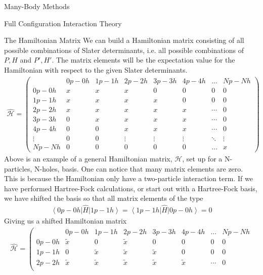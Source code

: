 \documentclass[twoside,english]{uiofysmaster}
\begin{document}
\begin{chapter}{Many-Body Methods}
\begin{section}{Full Configuration Interaction Theory}
		\begin{subsection}{The Hamiltonian Matrix}
			We can build a Hamiltonian matrix consisting of all possible combinations of Slater determinants, i.e. all possible combinations of $P,H$ and $P',H'$. The matrix elements will be the expectation value for the Hamiltonian with respect to the given Slater determinants. 
			\begin{align}
				\hat{ \mathcal{H} } = \left(  \begin{matrix}
							& 0p - 0h & 1p - 1h & 2p - 2h & 3p - 3h & 4p-4h & ... & Np - Nh \\ 
					0p - 0h & x 	  & x 		& x 	  & 0 		& 0 	& 0	   & 0 		\\		
					1p - 1h & x 	  & x 		& x 	  & x  		& 0 	& 0    & 0 		\\
					2p - 2h & x 	  & x 		& x 	  & x  		& x		&\cdots& 0		\\
					3p - 3h & 0 	  & x 		& x 	  & x  		& x 	&\cdots& 0 		\\
					4p - 4h & 0		  & 0 		& x 	  & x 		& x 	&\cdots& 0		\\
					\vdots 	& 0  	  & 0 	    & \vdots  & \vdots  & \vdots&\ddots& \vdots \\
					Np - Nh & 0 	  & 0		& 0 	  & 0 		& 0		&\hdots& x
				\end{matrix} \right)
			\end{align}
			Above is an example of a general Hamiltonian matrix, $\mathcal{H}$, set up for a N-particles, N-holes, basis. One can notice that many matrix elements are zero. This is because the Hamiltonian only have a two-particle interaction term. If we have performed Hartree-Fock calculations, or start out with a Hartree-Fock basis, we have shifted the basis so that all matrix elements of the type
			\begin{align}
				\left< 0p-0h \right| \hat H \left| 1p-1h \right> = \left< 1p-1h \right| \hat H \left| 0p-0h \right> = 0
			\end{align}
			Giving us a shifted Hamiltonian matrix 
			\begin{align}
				\hat{ \mathcal{H} } = \left(  \begin{matrix}
							& 0p - 0h & 1p - 1h & 2p - 2h & 3p - 3h & 4p - 4h & ... & Np - Nh \\ 
					0p - 0h & \tilde x& 0       & \tilde x& 0 		& 0 	  & 0	 & 0 		\\		
					1p - 1h & 0 	  & \tilde x& \tilde x& \tilde x& 0 	  & 0    & 0 		\\
					2p - 2h & \tilde x& \tilde x& \tilde x& \tilde x& \tilde x&\cdots& 0		\\

\end{matrix}
\end{align}
\end{subsection}
\end{section}
\end{chapter}
\end{document}
